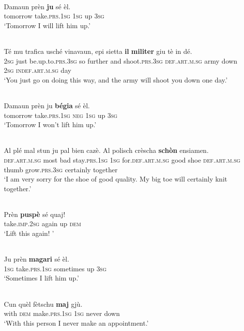 \ea\label{}
\\
\gll   Damaun prèn \textbf{ju} sé èl.\\
     tomorrow take.\textsc{prs.1sg} \textsc{1sg} up \textsc{3sg}\\
\glt `Tomorrow I will lift him up.'
\z

\ea\label{}
\\
\gll  Té mu trafica usché vinavaun, epi sietta \textbf{il} \textbf{militer} giu tè in dé.\\
     \textsc{2sg} just be.up.to.\textsc{prs.3sg} so further and shoot.\textsc{prs.3sg} \textsc{def.art.m.sg} army down \textsc{2sg} \textsc{indef.art.m.sg} day\\
\glt `You just go on doing this way, and the army will shoot you down one day.' 
\z

\ea\label{}
\\
\gll   Damaun prèn ju \textbf{bégia} sé èl.\\
     tomorrow take.\textsc{prs.1sg} \textsc{neg} \textsc{1sg} up \textsc{3sg}\\
\glt `Tomorrow I won’t lift him up.'
\z

\ea\label{}
 {\citealt[51]{Berther1998}}\\
\gll  Al plé mal stun ju pal bien cazè. Al polisch crèscha \textbf{schòn} ensiamen.\\
     \textsc{def.art.m.sg}  most bad stay.\textsc{prs.1sg}  \textsc{1sg} for.\textsc{def.art.m.sg} good shoe \textsc{def.art.m.sg} thumb grow.\textsc{prs.3sg}  certainly together\\
\glt `I am very sorry for the shoe of good quality. My big toe will certainly knit together.'
\z

\ea\label{}
\\
\gll  Prèn \textbf{puspè} sé quaj! \\
    take.\textsc{imp.2sg} again up \textsc{dem}  \\
\glt `Lift this again! '
\z

\ea\label{}
\\
\gll  Ju prèn \textbf{magari} sé èl.  \\
     \textsc{1sg} take.\textsc{prs.1sg} sometimes up \textsc{3sg}\\
\glt `Sometimes I lift him up.'
\z

\ea\label{}
\\
\gll  Cun quèl fètschu \textbf{maj} gjù.  \\
    with \textsc{dem} make.\textsc{prs.1sg} \textsc{1sg} never down\\
\glt `With this person I never make an appointment.'
\z

